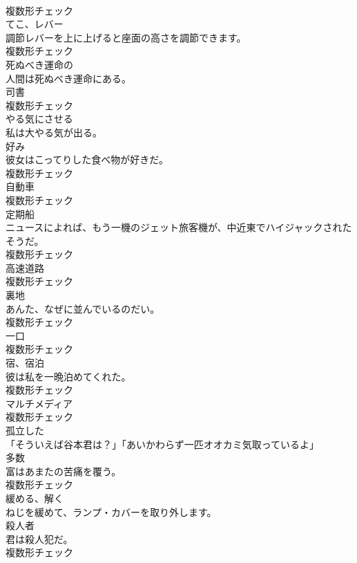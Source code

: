 \documentclass[8pt]{extreport}
\begin{document}
\begin{CJK}{UTF8}{min}
\\	複数形チェック
\\	[名詞]	てこ、レバー	
\\	調節レバーを上に上げると座面の高さを調節できます。	
\\	複数形チェック
\\	[形容詞]	死ぬべき運命の	
\\	人間は死ぬべき運命にある。	
\\	[名詞]	司書	
\\	複数形チェック
\\	[動詞]	やる気にさせる	
\\	私は大やる気が出る。	
\\	[名詞]	好み	
\\	彼女はこってりした食べ物が好きだ。	
\\	複数形チェック
\\	[名詞]	自動車	
\\	複数形チェック
\\	[名詞]	定期船	
\\	ニュースによれば、もう一機のジェット旅客機が、中近東でハイジャックされたそうだ。	
\\	複数形チェック
\\	[名詞]	高速道路	
\\	複数形チェック
\\	[名詞]	裏地	
\\	あんた、なぜに並んでいるのだい。	
\\	複数形チェック
\\	[名詞]	一口	
\\	複数形チェック
\\	[名詞]	宿、宿泊	
\\	彼は私を一晩泊めてくれた。	
\\	複数形チェック
\\	[名詞]	マルチメディア	
\\	複数形チェック
\\	[形容詞]	孤立した	
\\	「そういえば谷本君は？」「あいかわらず一匹オオカミ気取っているよ」	
\\	[名詞]	多数	
\\	富はあまたの苦痛を覆う。	
\\	複数形チェック
\\	[動詞]	緩める、解く	
\\	ねじを緩めて、ランプ・カバーを取り外します。	
\\	[名詞]	殺人者	
\\	君は殺人犯だ。	
\\	複数形チェック

\end{CJK}
\end{document}
